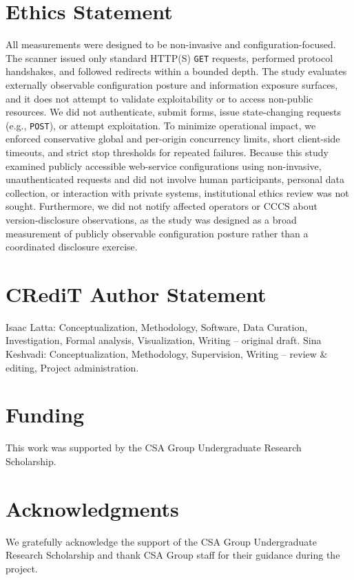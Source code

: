 \documentclass[a4paper,fleqn]{cas-sc}
\begin{document}
\section*{Ethics Statement}
All measurements were designed to be non-invasive and configuration-focused. The scanner issued only standard HTTP(S) \texttt{GET} requests, performed protocol handshakes, and followed redirects within a bounded depth. The study evaluates externally observable configuration posture and information exposure surfaces, and it does not attempt to validate exploitability or to access non-public resources. We did not authenticate, submit forms, issue state-changing requests (e.g., \texttt{POST}), or attempt exploitation. To minimize operational impact, we enforced conservative global and per-origin concurrency limits, short client-side timeouts, and strict stop thresholds for repeated failures. Because this study examined publicly accessible web-service configurations using non-invasive, unauthenticated requests and did not involve human participants, personal data collection, or interaction with private systems, institutional ethics review was not sought. Furthermore, we did not notify affected operators or CCCS about version-disclosure observations, as the study was designed as a broad measurement of publicly observable configuration posture rather than a coordinated disclosure exercise.

\section*{CRediT Author Statement}
Isaac Latta: Conceptualization, Methodology, Software, Data Curation, Investigation, Formal analysis, Visualization, Writing -- original draft. 
Sina Keshvadi: Conceptualization, Methodology, Supervision, Writing -- review \& editing, Project administration.

\section*{Funding}
This work was supported by the CSA Group Undergraduate Research Scholarship.


\section*{Acknowledgments}
We gratefully acknowledge the support of the CSA Group Undergraduate Research Scholarship and thank CSA Group staff for their guidance during the project.

\printcredits



\end{document}
